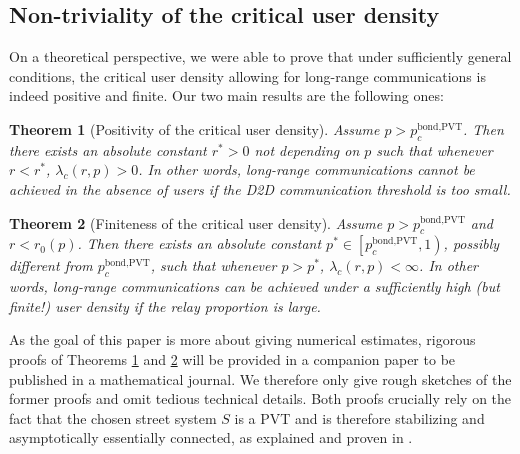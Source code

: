 \documentclass[conference]{IEEEtran}
\newtheorem{theorem}{Theorem}
\begin{document}
\subsection{Non-triviality of the critical user density}
On a theoretical perspective, we were able to prove that under sufficiently general conditions, the critical user density allowing for long-range communications is indeed positive and finite. Our two main results are the following ones:
\\
\begin{theorem}[Positivity of the critical user density]
\label{positivity-critical-lambda}
Assume $p > p^{\text{bond,PVT}}_{c}$. Then there exists an absolute constant $r^{*} > 0$ not depending on $p$ such that whenever $r < r^{*}$, $\lambda_{c}(r,p) > 0$. In other words, long-range communications cannot be achieved in the absence of users if the D2D communication threshold is too small. \\
\end{theorem}
\begin{theorem}[Finiteness of the critical user density]
\label{finiteness-critical-lambda}
Assume $p > p^{\text{bond,PVT}}_{c}$ and $r < r_{0}(p)$. Then there exists an absolute constant  $p^{*} \in \left[p_{c}^{\text{bond,PVT}},1\right)$, possibly different from $p_{c}^{\text{bond,PVT}}$, such that whenever $p > p^{*}$, $\lambda_{c}(r,p) < \infty $. In other words, long-range communications can be achieved under a sufficiently high (but finite!) user density if the relay proportion is large. \\
\end{theorem}
\indent As the goal of this paper is more about giving numerical estimates, rigorous proofs of Theorems \ref{positivity-critical-lambda} and \ref{finiteness-critical-lambda} will be provided in a companion paper to be published in a mathematical journal. We therefore only give rough sketches of the former proofs and omit tedious technical details. Both proofs crucially rely on the fact that the chosen street system $S$ is a PVT and is therefore stabilizing and asymptotically essentially connected, as explained and proven in \cite{hirsch_continuum_2017}. 
\\
\end{document}

